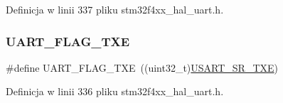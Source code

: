 Definicja w linii 337 pliku stm32f4xx\+\_\+hal\+\_\+uart.\+h.

\mbox{\label{group___u_a_r_t___flags_gad39c017d415a7774c82eb07413a9dbe4}} 
\subsubsection{\texorpdfstring{U\+A\+R\+T\+\_\+\+F\+L\+A\+G\+\_\+\+T\+XE}{UART\_FLAG\_TXE}}
{\footnotesize\ttfamily \#define U\+A\+R\+T\+\_\+\+F\+L\+A\+G\+\_\+\+T\+XE~((uint32\+\_\+t)\hyperlink{group___peripheral___registers___bits___definition_ga65e9cddf0890113d405342f1d8b5b980}{U\+S\+A\+R\+T\+\_\+\+S\+R\+\_\+\+T\+XE})}



Definicja w linii 336 pliku stm32f4xx\+\_\+hal\+\_\+uart.\+h.


